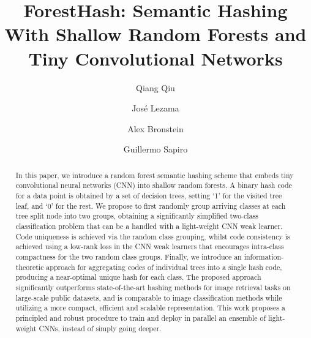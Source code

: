 \documentclass[runningheads]{llncs}
\begin{document}
%
\title{ForestHash: Semantic Hashing With Shallow Random Forests and Tiny Convolutional Networks} 

%

\author{Qiang Qiu \and
Jos\'e Lezama \and
Alex Bronstein \and
Guillermo Sapiro}
%
%

%
\maketitle              %
%
\begin{abstract}
In this paper, we introduce a random forest semantic hashing scheme that embeds
tiny convolutional neural networks (CNN) into shallow random forests.  A binary
hash code for a data point is obtained by a set of decision trees, setting `1'
for the visited tree leaf, and `0' for the rest.  We propose to first randomly
group arriving classes at each tree split node into two groups, obtaining a
significantly simplified two-class classification problem that can be a handled
with a light-weight CNN weak learner. Code uniqueness is achieved via the random
class grouping, whilst code consistency is achieved using a low-rank loss in the
CNN weak learners that encourages intra-class compactness for the two random class
groups. Finally, we introduce an information-theoretic approach for aggregating
codes of individual trees into a single hash code, producing a near-optimal
unique hash for each class. The proposed approach significantly outperforms
state-of-the-art hashing methods for image retrieval tasks on large-scale public
datasets, and is comparable to image classification methods while utilizing a
more compact, efficient and scalable representation. This work proposes a
principled and robust procedure to train and deploy in parallel an ensemble of
light-weight CNNs, instead of simply going deeper.
%
\end{abstract}
%
%
%
\end{document}
